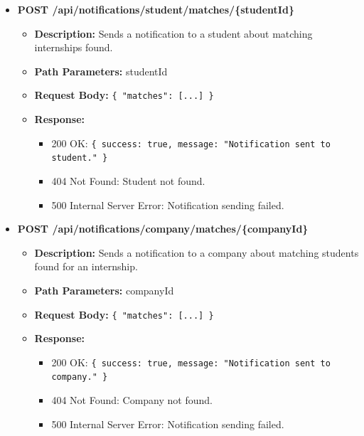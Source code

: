 \begin{itemize}
    \item \textbf{POST /api/notifications/student/matches/\{studentId\}}  
    \begin{itemize}
        \item \textbf{Description:} Sends a notification to a student about matching internships found.
        \item \textbf{Path Parameters:} studentId  
        \item \textbf{Request Body:} 
        \texttt{\{ 
            "matches": [...] 
        \}}
        \item \textbf{Response:}
        \begin{itemize}
            \item 200 OK: \texttt{\{ success: true, message: "Notification sent to student." \}}
            \item 404 Not Found: Student not found.
            \item 500 Internal Server Error: Notification sending failed.
        \end{itemize}
    \end{itemize}


    \item \textbf{POST /api/notifications/company/matches/\{companyId\}}  
    \begin{itemize}
        \item \textbf{Description:} Sends a notification to a company about matching students found for an internship.
        \item \textbf{Path Parameters:} companyId  
        \item \textbf{Request Body:} 
        \texttt{\{ 
            "matches": [...] 
        \}}
        \item \textbf{Response:}
        \begin{itemize}
            \item 200 OK: \texttt{\{ success: true, message: "Notification sent to company." \}}
            \item 404 Not Found: Company not found.
            \item 500 Internal Server Error: Notification sending failed.
        \end{itemize}
    \end{itemize}


\end{itemize}
